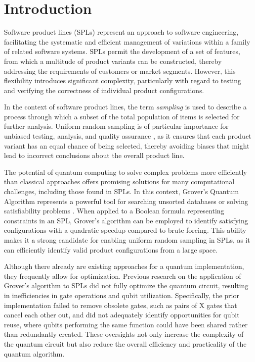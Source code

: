 \section{Introduction}
Software product lines (SPLs) represent an approach to software engineering, facilitating the systematic and efficient management of variations within a family of related software systems. 
SPLs permit the development of a set of features, from which a multitude of product variants can be constructed, thereby addressing the requirements of customers or market segments.
However, this flexibility introduces significant complexity, particularly with regard to testing and verifying the correctness of individual product configurations.

In the context of software product lines, the term \textit{sampling} is used to describe a process through which a subset of the total population of items is selected for further analysis.
Uniform random sampling is of particular importance for unbiased testing, analysis, and quality assurance \cite{plazar-spl-sampling, dutra-sat-sampling, oh-spl-random-sampling, oh-t-wise}, as it ensures that each product variant has an equal chance of being selected, thereby avoiding biases that might lead to incorrect conclusions about the overall product line.

The potential of quantum computing to solve complex problems more efficiently than classical approaches offers promising solutions for many computational challenges, including those found in SPLs.
In this context, Grover's Quantum Algorithm represents a powerful tool for searching unsorted databases or solving satisfiability problems \cite{math11081888, Hangleiter_2023}.
When applied to a Boolean formula representing constraints in an SPL, Grover's algorithm can be employed to identify satisfying configurations with a quadratic speedup compared to brute forcing.
This ability makes it a strong candidate for enabling uniform random sampling in SPLs, as it can efficiently identify valid product configurations from a large space.

Although there already are existing approaches for a quantum implementation, they frequently allow for optimization.
Previous research on the application of Grover's algorithm to SPLs did not fully optimize the quantum circuit, resulting in inefficiencies in gate operations and qubit utilization.
Specifically, the prior implementation failed to remove obsolete gates, such as pairs of X gates that cancel each other out, and did not adequately identify opportunities for qubit reuse, where qubits performing the same function could have been shared rather than redundantly created.
These oversights not only increase the complexity of the quantum circuit but also reduce the overall efficiency and practicality of the quantum algorithm.

